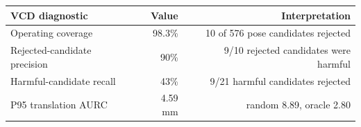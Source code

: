 \begin{tabular}{lrr}
\toprule
VCD diagnostic & Value & Interpretation \\
\midrule
Operating coverage & 98.3\% & 10 of 576 pose candidates rejected \\
Rejected-candidate precision & 90\% & 9/10 rejected candidates were harmful \\
Harmful-candidate recall & 43\% & 9/21 harmful candidates rejected \\
P95 translation AURC & 4.59 mm & random 8.89, oracle 2.80 \\
\bottomrule
\end{tabular}
